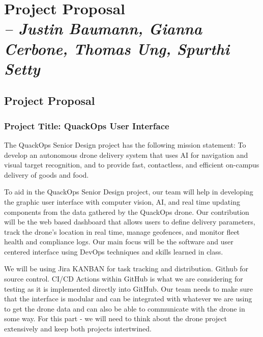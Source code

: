 \chapter{Project Proposal \\
\small{\textit{-- Justin Baumann, Gianna Cerbone, Thomas Ung, Spurthi Setty}} 
\label{Chapter::ProjectProposal}}

\section{Project Proposal \label{Section:Description}}

\subsection{Project Title: QuackOps User Interface}

The QuackOps Senior Design project has the following mission statement: 
To develop an autonomous drone delivery system that uses AI for navigation and visual target recognition, and to provide fast, contactless, and efficient on-campus delivery of goods and food.

To aid in the QuackOps Senior Design project, our team will help in developing the graphic user interface with computer vision, AI, and real time updating components from the data gathered by the QuackOps drone. Our contribution will be the web based dashboard that allows users to define delivery parameters, track the drone's location in real time, manage geofences, and monitor fleet health and compliance logs. Our main focus will be the software and user centered interface using DevOps techniques and skills learned in class. 

We will be using Jira KANBAN for task tracking and distribution. Github for source control. CI/CD Actions within GitHub is what we are considering for testing as it is implemented directly into GitHub. Our team needs to make sure that the interface is modular and can be integrated with whatever we are using to get the drone data and can also be able to communicate with the drone in some way. For this part - we will need to think about the drone project extensively and keep both projects intertwined. 


